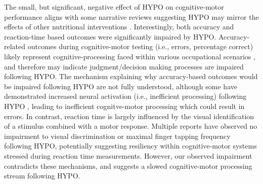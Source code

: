 The small, but significant, negative effect of HYPO on cognitive-motor performance aligns with some narrative reviews suggesting HYPO may mirror the effects of other nutritional interventions \cite{masento_effects_2014}. Interestingly, both accuracy and reaction-time based outcomes were significantly impaired by HYPO. Accuracy-related outcomes during cognitive-motor testing (i.e., errors, percentage correct) likely represent cognitive-processing faced within various occupational scenarios \cite{wickens_multiple_2002}, and therefore may indicate judgment/decision making processes are impaired following HYPO. The mechanism explaining why accuracy-based outcomes would be impaired following HYPO are not fully understood, although some have demonstrated increased neural activation (i.e., inefficient processing) following HYPO \cite{kempton_dehydration_2011}, leading to inefficient cognitve-motor processing which could result in errors. In contrast, reaction time is largely influenced by the visual identification of a stimulus combined with a motor response. Multiple reports have observed no impairment to visual discrimination \cite{grego_influence_2005, van_den_heuvel_independent_2017} or maximal finger tapping frequency \cite{bandelow_effects_2010} following HYPO, potentially suggesting resiliency within cognitive-motor systems stressed during reaction time measurements. However, our observed impairment contradicts these mechanisms, and suggests a slowed cognitive-motor processing stream following HYPO.

